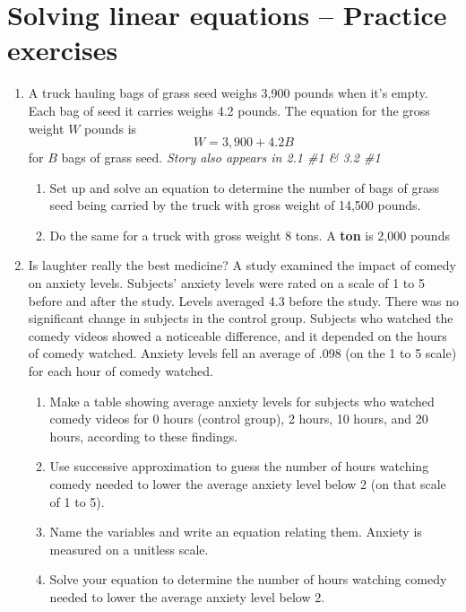 \section{Solving linear equations -- Practice exercises}

\begin{enumerate}

\item A truck hauling bags of grass seed weighs 3,900 pounds when it's empty.  Each bag of seed it carries weighs 4.2 pounds.   The equation for the gross weight $W$ pounds is $$W = 3,900 + 4.2B$$ for $B$ bags of grass seed.  \hfill \emph{Story also appears in 2.1 \#1 \& 3.2 \#1}
\begin{enumerate} 
\item Set up and solve an equation to determine the number of bags of grass seed being carried by the truck with gross weight of 14,500 pounds. \vfill
\item Do the same for a truck with gross weight 8 tons. A \textbf{ton} is 2,000 pounds \vfill \vfill
\end{enumerate} 

\newpage %

\item Is laughter really the best medicine?  A study examined the impact of comedy on anxiety levels.  Subjects' anxiety levels were rated on a scale of 1 to 5 before and after the study.  Levels averaged 4.3 before the study.  There was no significant change in subjects in the control group.  Subjects who watched the comedy videos showed a noticeable difference, and it depended on the hours of comedy watched.  Anxiety levels fell an average of .098 (on the 1 to 5 scale) for each hour of comedy watched.
\begin{enumerate}
\item Make a table showing average anxiety levels for subjects who watched comedy videos for 0 hours (control group), 2 hours, 10 hours, and 20 hours, according to these findings.  \vfill
\item Use successive approximation to guess the number of hours watching comedy needed to lower the average anxiety level below 2 (on that scale of 1 to 5). \vfill
\item Name the variables and write an equation relating them.  Anxiety is measured on a unitless scale. \vfill
\item Solve your equation to determine the number of hours watching comedy needed to lower the average anxiety level below 2. \vfill
\end{enumerate}


\end{enumerate}

